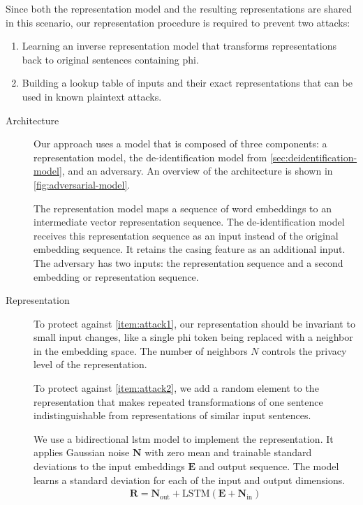 %
Since both the representation model and the resulting representations are shared in this scenario, our representation procedure is required to prevent two attacks:
%
\begin{enumerate}[label=A\arabic*.,ref=A\arabic*]
    \item Learning an inverse representation model that transforms representations back to original sentences containing \ac{phi}.\label{item:attack1}
    \item Building a lookup table of inputs and their exact representations that can be used in known plaintext attacks.\label{item:attack2}
\end{enumerate}

\begin{description}
    \item[Architecture]
    Our approach uses a model that is composed of three components: a representation model, the de-identification model from \cref{sec:deidentification-model}, and an adversary.
    An overview of the architecture is shown in \cref{fig:adversarial-model}.
    
    The representation model maps a sequence of word embeddings to an intermediate vector representation sequence.
    The de-identification model receives this representation sequence as an input instead of the original embedding sequence.
    It retains the casing feature as an additional input.
    The adversary has two inputs: the representation sequence and a second embedding or representation sequence.
    
    \item[Representation]
    To protect against \ref{item:attack1}, our representation should be invariant to small input changes, like a single \ac{phi} token being replaced with a neighbor in the embedding space.
    The number of neighbors $N$ controls the privacy level of the representation.
    
    To protect against \ref{item:attack2}, we add a random element to the representation that makes repeated transformations of one sentence indistinguishable from representations of similar input sentences.
    
    We use a bidirectional \ac{lstm} model to implement the representation.
    It applies Gaussian noise $\bm{N}$ with zero mean and trainable standard deviations to the input embeddings $\bm{E}$ and output sequence.
    The model learns a standard deviation for each of the input and output dimensions.
    \begin{align}
    \bm{R} = \bm{N}_{\text{out}} + \text{LSTM}(\bm{E} + \bm{N}_{\text{in}})
    \end{align}
    

\end{description}
